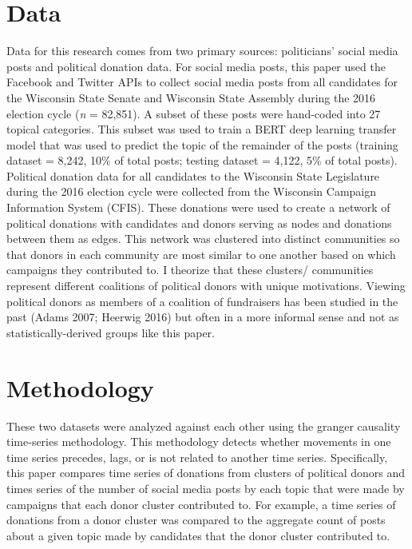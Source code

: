 \documentclass[12pt,]{article}
\begin{document}
\hypertarget{data}{%
\section{Data}\label{data}}

Data for this research comes from two primary sources: politicians'
social media posts and political donation data. For social media posts,
this paper used the Facebook and Twitter APIs to collect social media
posts from all candidates for the Wisconsin State Senate and Wisconsin
State Assembly during the 2016 election cycle (\emph{n} = 82,851). A
subset of these posts were hand-coded into 27 topical categories. This
subset was used to train a BERT deep learning transfer model that was
used to predict the topic of the remainder of the posts (training
dataset = 8,242, 10\% of total posts; testing dataset = 4,122, 5\% of
total posts). Political donation data for all candidates to the
Wisconsin State Legislature during the 2016 election cycle were
collected from the Wisconsin Campaign Information System (CFIS). These
donations were used to create a network of political donations with
candidates and donors serving as nodes and donations between them as
edges. This network was clustered into distinct communities so that
donors in each community are most similar to one another based on which
campaigns they contributed to. I theorize that these clusters/
communities represent different coalitions of political donors with
unique motivations. Viewing political donors as members of a coalition
of fundraisers has been studied in the past (Adams 2007; Heerwig 2016)
but often in a more informal sense and not as statistically-derived
groups like this paper.

\hypertarget{methodology}{%
\section{Methodology}\label{methodology}}

These two datasets were analyzed against each other using the granger
causality time-series methodology. This methodology detects whether
movements in one time series precedes, lags, or is not related to
another time series. Specifically, this paper compares time series of
donations from clusters of political donors and times series of the
number of social media posts by each topic that were made by campaigns
that each donor cluster contributed to. For example, a time series of
donations from a donor cluster was compared to the aggregate count of
posts about a given topic made by candidates that the donor cluster
contributed to.
\end{document}
